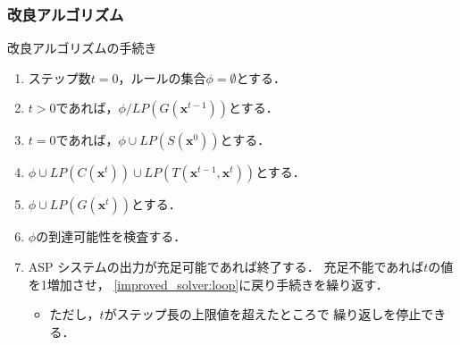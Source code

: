 \documentclass[dvipdfmx,11pt]{beamer}
\begin{document}
\begin{frame}
  \frametitle{改良アルゴリズム}

  \begin{block}{改良アルゴリズムの手続き}
    \begin{enumerate}
      \item ステップ数$t=0$，ルールの集合$\phi = \emptyset$とする．
      \item $t>0$であれば，$\phi/LP(G(\bm{x}^{t -1}))$とする．
        \label{improved_solver:loop}
      \item $t=0$であれば，$\phi\cup LP(S(\bm{x}^0))$とする．
      \item $\phi\cup LP(C(\bm{x}^{t}))\cup LP(T(\bm{x}^{t-1},\bm{x}^{t}))$とする．
      \item $\phi\cup LP(G(\bm{x}^{t}))$とする．
      \item $\phi$の到達可能性を検査する．
      \item ASP システムの出力が充足可能であれば終了する．
            充足不能であれば$t$の値を1増加させ，
            \ref{improved_solver:loop}に戻り手続きを繰り返す．
            \begin{itemize}
              \item ただし，$t$がステップ長の上限値を超えたところで
                    繰り返しを停止できる．
            \end{itemize} \label{improved_solver:end}
    \end{enumerate}
  \end{block}
\end{frame}
\end{document}
